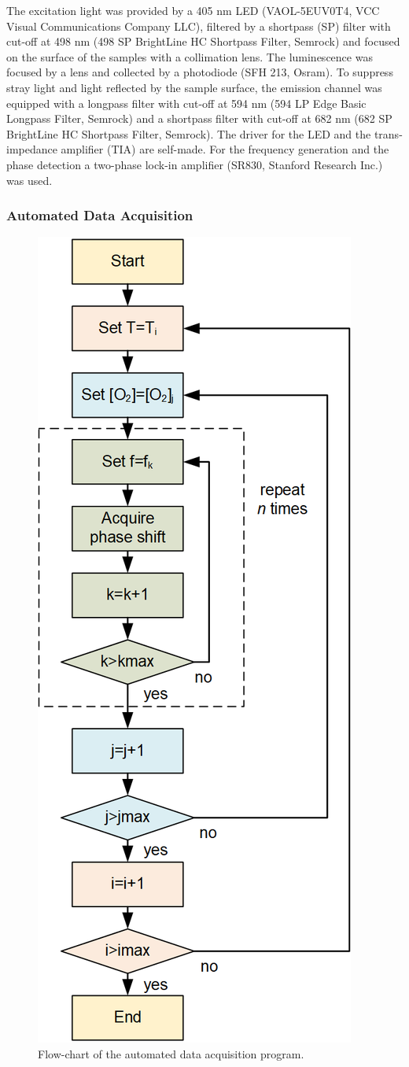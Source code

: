 \documentclass[final,5p,times,twocolumn]{elsarticle}
\begin{document}
The excitation light was provided by a 405 nm LED (VAOL-5EUV0T4, VCC Visual Communications Company LLC), filtered by a shortpass (SP) filter with cut-off at 498 nm (498 SP BrightLine HC Shortpass Filter, Semrock) and focused on the surface of the samples with a collimation lens. The luminescence was focused by a lens and collected by a photodiode (SFH 213, Osram).
To suppress stray light and light reflected by the sample surface, the emission channel was equipped with a longpass filter with cut-off at 594 nm (594 LP Edge Basic Longpass Filter, Semrock) and a shortpass filter with cut-off at 682 nm (682 SP BrightLine HC Shortpass Filter, Semrock). The driver for the LED and the trans-impedance amplifier (TIA) are self-made.
For the frequency generation and the phase detection a two-phase lock-in amplifier (SR830, Stanford Research Inc.) was used. 

\subsubsection{Automated Data Acquisition}
\label{Data}

\begin{figure}[b!]
\centering
\includegraphics[keepaspectratio, width=5.8 cm]{flow-chart.png}
\caption{Flow-chart of the automated data acquisition program.}
\label{fig:auto-data}
\end{figure}
\end{document}

